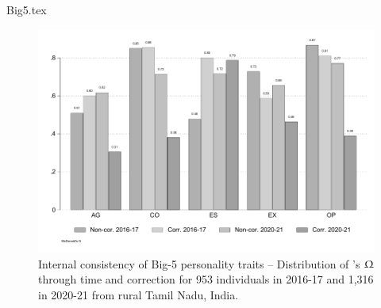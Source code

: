 \documentclass[a4paper, 12pt, onecolumn]{article}
\begin{document}

















{Big5.tex}

\begin{figure}[!h]
\raggedright
\includegraphics[scale=0.8]{INPUT/omega}
\caption{Internal consistency of Big-5 personality traits -- Distribution of \citeauthor{McDonald1999}'s $\Upomega$ through time and correction for 953 individuals in 2016-17 and 1,316 in 2020-21 from rural Tamil Nadu, India.}
\label{fig:omega}
\end{figure}
\end{document}
